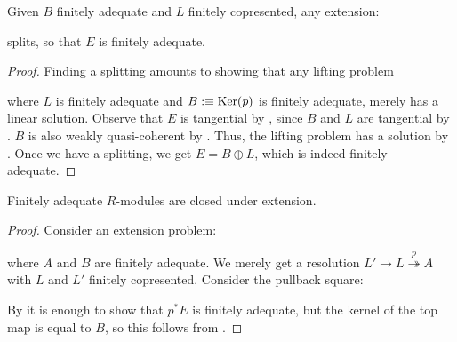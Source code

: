 \begin{lemma}\label{prp:extension-fin-adeq-lin-adeq}
Given $B$ finitely adequate and $L$ finitely copresented, any extension:
    \begin{center}
  \end{center}
   splits, so that $E$ is finitely adequate.
\end{lemma}

\begin{proof}
Finding a splitting amounts to showing that any lifting problem
  \begin{center}
  \end{center}
  where $L$ is finitely adequate and $B :\equiv \operatorname{Ker}(p)$ is finitely adequate, merely has a linear solution.
  Observe that $E$ is tangential by , since $B$ and $L$ are tangential by .
  $B$ is also weakly quasi-coherent by .
  Thus, the lifting problem has a solution by . Once we have a splitting, we get $E=B \oplus L$, which is indeed finitely adequate.
\end{proof}

\begin{theorem}\label{thm:fin-adeq-ext-closed}
  Finitely adequate $R$-modules are closed under extension.
\end{theorem}

\begin{proof}
 Consider an extension problem:
  \begin{center}
  \end{center}
  where $A$ and $B$ are finitely adequate. We merely get a resolution $L' \rightarrow L \overset{p}{\twoheadrightarrow} A$ with $L$ and $L'$ finitely copresented. Consider the pullback square:
    \begin{center}
  \end{center}
  By  it is enough to show that $p^*E$ is finitely adequate, but the kernel of the top map is equal to $B$, so this follows from .
\end{proof}

